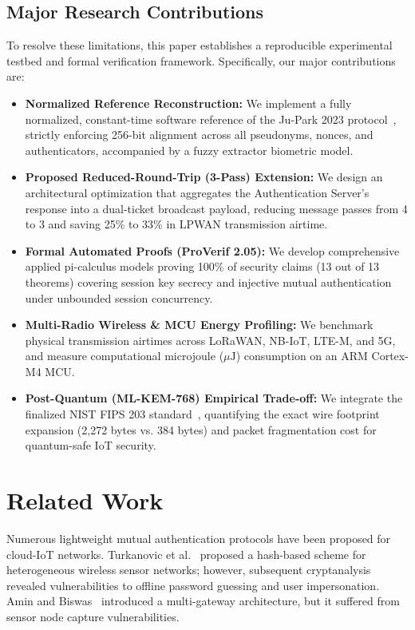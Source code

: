 \documentclass[journal,10pt,twocolumn]{IEEEtran}
\begin{document}
\subsection{Major Research Contributions}
To resolve these limitations, this paper establishes a reproducible experimental testbed and formal verification framework. Specifically, our major contributions are:
\begin{itemize}
    \item \textbf{Normalized Reference Reconstruction:} We implement a fully normalized, constant-time software reference of the Ju-Park 2023 protocol~\cite{jupark2023}, strictly enforcing 256-bit alignment across all pseudonyms, nonces, and authenticators, accompanied by a fuzzy extractor biometric model.
    \item \textbf{Proposed Reduced-Round-Trip (3-Pass) Extension:} We design an architectural optimization that aggregates the Authentication Server's response into a dual-ticket broadcast payload, reducing message passes from 4 to 3 and saving 25\% to 33\% in LPWAN transmission airtime.
    \item \textbf{Formal Automated Proofs (ProVerif 2.05):} We develop comprehensive applied pi-calculus models proving 100\% of security claims (13 out of 13 theorems) covering session key secrecy and injective mutual authentication under unbounded session concurrency.
    \item \textbf{Multi-Radio Wireless \& MCU Energy Profiling:} We benchmark physical transmission airtimes across LoRaWAN, NB-IoT, LTE-M, and 5G, and measure computational microjoule ($\mu\text{J}$) consumption on an ARM Cortex-M4 MCU.
    \item \textbf{Post-Quantum (ML-KEM-768) Empirical Trade-off:} We integrate the finalized NIST FIPS 203 standard~\cite{fips203}, quantifying the exact wire footprint expansion (2,272 bytes vs. 384 bytes) and packet fragmentation cost for quantum-safe IoT security.
\end{itemize}

\section{Related Work}
Numerous lightweight mutual authentication protocols have been proposed for cloud-IoT networks. Turkanovic et al.~\cite{turkanovic2014} proposed a hash-based scheme for heterogeneous wireless sensor networks; however, subsequent cryptanalysis revealed vulnerabilities to offline password guessing and user impersonation. Amin and Biswas~\cite{amin2016} introduced a multi-gateway architecture, but it suffered from sensor node capture vulnerabilities.
\end{document}

